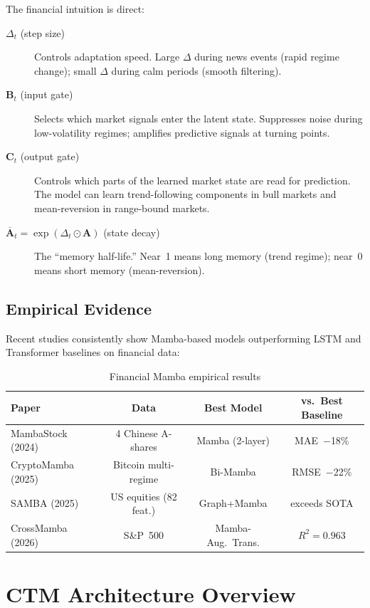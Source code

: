 \documentclass[11pt,a4paper]{article}
\begin{document}
The financial intuition is direct:
\begin{description}
  \item[$\Delta_t$ (step size)] Controls adaptation speed. Large $\Delta$ during
    news events (rapid regime change); small $\Delta$ during calm periods (smooth filtering).
  \item[$\mathbf{B}_t$ (input gate)] Selects which market signals enter the
    latent state. Suppresses noise during low-volatility regimes; amplifies predictive
    signals at turning points.
  \item[$\mathbf{C}_t$ (output gate)] Controls which parts of the learned market
    state are read for prediction. The model can learn trend-following components
    in bull markets and mean-reversion in range-bound markets.
  \item[$\overline{\mathbf{A}}_t = \exp(\Delta_t \odot \mathbf{A})$ (state decay)]
    The ``memory half-life.'' Near~1 means long memory (trend regime); near~0 means
    short memory (mean-reversion).
\end{description}

\subsection{Empirical Evidence}

Recent studies consistently show Mamba-based models outperforming LSTM and
Transformer baselines on financial data:

\begin{table}[h]
\centering
\caption{Financial Mamba empirical results}
\label{tab:results}
\begin{tabular}{lccc}
\toprule
Paper & Data & Best Model & vs.\ Best Baseline \\
\midrule
MambaStock (2024) & 4 Chinese A-shares & Mamba (2-layer) & MAE~$-$18\% \\
CryptoMamba (2025) & Bitcoin multi-regime & Bi-Mamba & RMSE~$-$22\% \\
SAMBA (2025) & US equities (82 feat.) & Graph+Mamba & exceeds SOTA \\
CrossMamba (2026) & S\&P~500 & Mamba-Aug.~Trans. & $R^2 = 0.963$ \\
\bottomrule
\end{tabular}
\end{table}

\section{CTM Architecture Overview}
\end{document}

